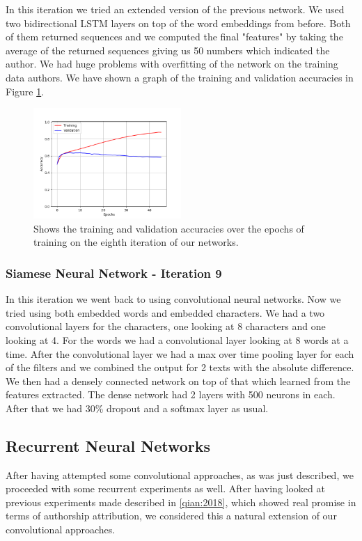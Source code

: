 In this iteration we tried an extended version of the previous network. We used
two bidirectional \gls{LSTM} layers on top of the word embeddings from before.
Both of them returned sequences and we computed the final "features" by taking
the average of the returned sequences giving us 50 numbers which indicated the
author. We had huge problems with overfitting of the network on the training
data authors. We have shown a graph of the training and validation accuracies
in Figure \ref{fig:network_8_accuracies}.

\begin{figure}
    \centering
    \includegraphics[width=0.5\textwidth]{./pictures/experiments/network_8_accuracies.png}
    \caption{Shows the training and validation accuracies over the epochs of
        training on the eighth iteration of our networks.}
    \label{fig:network_8_accuracies}
\end{figure}


\subsubsection{Siamese Neural Network - Iteration 9}

In this iteration we went back to using convolutional neural networks. Now we
tried using both embedded words and embedded characters. We had a two
convolutional layers for the characters, one looking at 8 characters and one
looking at 4. For the words we had a convolutional layer looking at 8 words at a
time. After the convolutional layer we had a max over time pooling layer for
each of the filters and we combined the output for 2 texts with the absolute
difference. We then had a densely connected network on top of that which learned
from the features extracted. The dense network had 2 layers with 500 neurons in
each. After that we had 30\% dropout and a softmax layer as usual.



\subsection{Recurrent Neural Networks}
After having attempted some convolutional approaches, as was just described, 
we proceeded with some recurrent experiments as well. After having looked
at previous experiments made described in \ref{qian:2018}, which showed real
promise in terms of authorship attribution, we considered this a
natural extension of our convolutional approaches.


